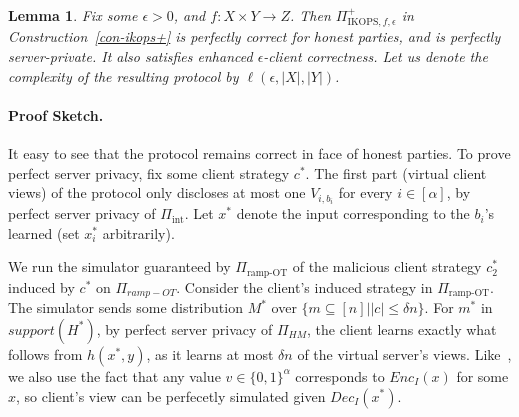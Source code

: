\documentclass[a4paper]{article}
\newtheorem{theorem}{Theorem}[section]
\newtheorem{lemma}[theorem]{Lemma}
\newcommand{\INT}{\Pi_{\text{int}}}
\begin{document}
\begin{lemma}\label{thm-pcl}
	Fix some $\epsilon>0$, and $f:X\times Y\rightarrow Z$. Then $\Pi^+_{\text{IKOPS},f,\epsilon}$ in
	Construction~\ref{con-ikops+} is perfectly correct for honest parties, and is perfectly server-private. It also satisfies enhanced $\epsilon$-client correctness. Let us denote the complexity of the resulting protocol by $\ell(\epsilon,|X|,|Y|)$.
\end{lemma}



\paragraph{Proof Sketch.} It easy to see that the protocol remains correct in face of honest parties. 
To prove  perfect server privacy, fix some client strategy $c^*$. The first part (virtual client views) of the protocol only discloses at most one $V_{i,b_i}$ for every $i\in[\alpha]$, by perfect server privacy of $\INT$. Let $x^*$ denote the input corresponding to the $b_i$'s learned (set $x^*_i$ arbitrarily).

We run the simulator guaranteed by $\Pi_{\text{ramp-OT}}$ of the malicious client strategy $c^*_2$ induced by $c^*$ on $\Pi_{ramp-OT}$. 
Consider the client's induced strategy in $\Pi_{\text{ramp-OT}}$. The simulator sends some distribution $M^*$ over $\{m\subseteq [n]||c|\leq \delta n\}$.
For $m^*$ in $support(H^*)$, by perfect server privacy of $\Pi_{HM}$, the client learns exactly what follows from $h(x^*,y)$, as it learns at most $\delta n$ of the virtual server's views. Like~\cite{IKOPS11}, we also use the fact that any value $v\in \{0,1\}^{\alpha}$ corresponds to $Enc_I(x)$ for some $x$, so client's view can be perfecetly simulated given $Dec_I(x^*)$.
\end{document}
